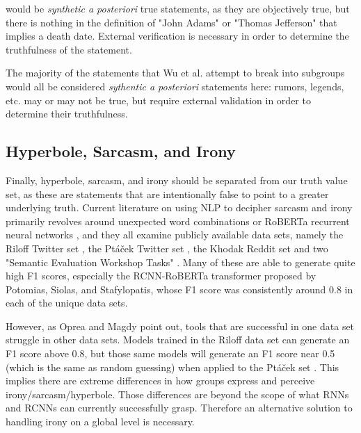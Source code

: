 \documentclass[12pt]{article}
\begin{document}
would be \textit{synthetic a posteriori} true statements, as they are objectively true, but there is nothing in the definition of "John Adams" or "Thomas Jefferson" that implies a death date. External verification is necessary in order to determine the truthfulness of the statement.

The majority of the statements that Wu et al. attempt to break into subgroups would all be considered \textit{sythentic a posteriori} statements here: rumors, legends, etc. may or may not be true, but require external validation in order to determine their truthfulness.

\subsection{Hyperbole, Sarcasm, and Irony}
\label{hyperbole}
Finally, hyperbole, sarcasm, and irony should be separated from our truth value set, as these are statements that are intentionally false to point to a greater underlying truth. 
Current literature on using NLP to decipher sarcasm and irony primarily revolves around unexpected word combinations \cite{barbieri2014modelling,buschmeier2014impact,ghosh2015sarcastic} or RoBERTa recurrent neural networks \cite{potamias2020transformer}, and they all examine publicly available data sets, namely the Riloff Twitter set \cite{riloff2013sarcasm}, the Pt{\'a}{\v{c}}ek Twitter set \cite{ptavcek2014sarcasm}, the Khodak Reddit set \cite{khodak2017large} and two "Semantic Evaluation Workshop Tasks" \cite{van2018semeval,ghosh2015semeval}. Many of these are able to generate quite high F1 scores, especially the RCNN-RoBERTa transformer proposed by Potomias, Siolas, and Stafylopatis, whose F1 score was consistently around 0.8 in each of the unique data sets. 

However, as Oprea and Magdy point out, tools that are successful in one data set struggle in other data sets. Models trained in the Riloff data set can generate an F1 score above 0.8, but those same models will generate an F1 score near 0.5 (which is the same as random guessing) when applied to the Pt{\'a}{\v{c}}ek set \cite{oprea2019exploring}. This implies there are extreme differences in how groups express and perceive irony/sarcasm/hyperbole. Those differences are beyond the scope of what RNNs and RCNNs can currently successfully grasp. Therefore an alternative solution to handling irony on a global level is necessary.
\end{document}
